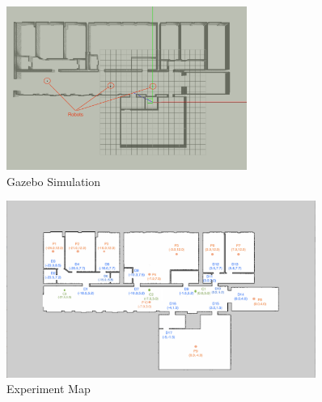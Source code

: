     

\begin{figure}[htbp]
	\centering
	\includegraphics[width = 0.7\textwidth]{content/images/ch5/gazebo_model.png}
	\caption{Gazebo Simulation}
	\label{fig:gazebo_model}
\end{figure}

\begin{figure}[htbp]
    \centering
    \includegraphics[width = 0.9\textwidth]{content/images/ch5/door_station_points.png}
    \caption{Experiment Map}
    \label{fig:exp_map}
\end{figure}



